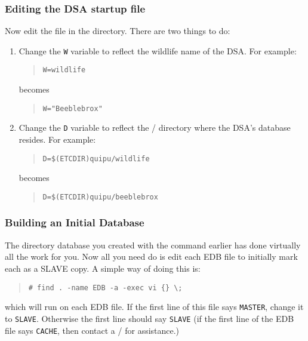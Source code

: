 \subsubsection	{Editing the DSA startup file}
Now edit the  file in the  directory.
There are two things to do:
\begin{enumerate}
\item	Change the \verb"W" variable to reflect the wildlife name of the DSA.
	For example:
\begin{quote}\small\begin{verbatim}
W=wildlife
\end{verbatim}\end{quote}
	becomes
\begin{quote}\small\begin{verbatim}
W="Beeblebrox"
\end{verbatim}\end{quote}

\item	Change the \verb"D" variable to reflect the \unix/ directory where
the DSA's database resides.
	For example:
\begin{quote}\small\begin{verbatim}
D=$(ETCDIR)quipu/wildlife
\end{verbatim}\end{quote}
	becomes
\begin{quote}\small\begin{verbatim}
D=$(ETCDIR)quipu/beeblebrox
\end{verbatim}\end{quote}
\end{enumerate}

\subsubsection	{Building an Initial Database}
The directory database you created with the  command earlier has done
virtually all the work for you.
Now all you need do is edit each EDB file to initially mark each as a
SLAVE copy.
A simple way of doing this is:
\begin{quote}\small\begin{verbatim}
# find . -name EDB -a -exec vi {} \;
\end{verbatim}\end{quote}
which will run  on each EDB file.
If the first line of this file says \verb"MASTER",
change it to \verb"SLAVE".
Otherwise the first line should say \verb"SLAVE"
(if the first line of the EDB file says \verb"CACHE",
then contact a \camayoc/ for assistance.)

